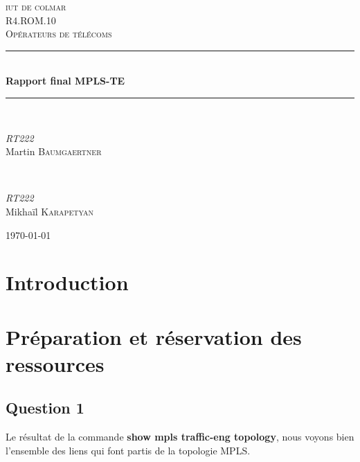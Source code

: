 \documentclass[12pt, a4paper]{article}
\begin{document}
\begin{titlepage}
	\newcommand{\HRule}{\rule{\linewidth}{0.5mm}} 
	\center 
	\textsc{\LARGE iut de colmar}\\[6.5cm] 
	\textsc{\Large R4.ROM.10}\\[0.5cm] 
	\textsc{\large Opérateurs de télécoms}\\[0.5cm]
	\HRule\\[0.75cm]
	{\huge\bfseries Rapport final MPLS-TE}\\[0.4cm]
	\HRule\\[1.5cm]


	\begin{minipage}{0.4\textwidth}
		\begin{flushleft}
			\large
			\textit{RT222}\\
			Martin \textsc{Baumgaertner}
		\end{flushleft}
	\end{minipage}
	~
	\begin{minipage}{0.4\textwidth}
		\begin{flushright}
			\large
			\textit{RT222}\\
			Mikhaïl \textsc{Karapetyan}
		\end{flushright}
	\end{minipage}
    
	\vfill\vfill\vfill
	{\large\today} 
	\vfill
\end{titlepage}
\newpage
\tableofcontents
\newpage



\newpage
\section{Introduction}

\section{Préparation et réservation des ressources}
\subsection{Question 1}
Le résultat de la commande \textbf{show mpls traffic-eng topology}, nous voyons bien 
l'ensemble des liens qui font partis de la topologie MPLS. 
\end{document}

